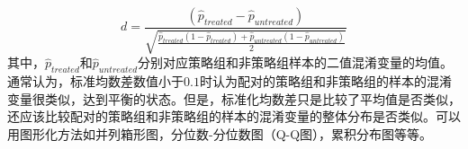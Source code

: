 \begin{equation}d = \frac{(\hat{p}_{treated} - \hat{p}_{untreated})}{\sqrt{\frac{\hat{p}_{treated}(1 - \hat{p}_{treated}) + \hat{p}_{untreated}(1 - \hat{p}_{untreated})}{2}}}\end{equation}
其中，$\hat{p}_{treated}$和$\hat{p}_{untreated}$分别对应策略组和非策略组样本的二值混淆变量的均值。通常认为，标准均数差数值小于$0.1$时认为配对的策略组和非策略组的样本的混淆变量很类似，达到平衡的状态\cite{Normand 2001}。但是，标准化均数差只是比较了平均值是否类似，还应该比较配对的策略组和非策略组的样本的混淆变量的整体分布是否类似。可以用图形化方法如并列箱形图，分位数-分位数图（Q-Q图），累积分布图等等。




















